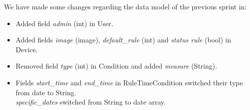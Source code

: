 \documentclass[11pt,a4paper]{article}
\begin{document}
We have made some changes regarding the data model of the previous sprint in:
\begin{itemize}
    \item Added field \textit{admin} (int) in User.
    \item Added fields \textit{image} (image), \textit{default\_rule} (int) and \textit{status rule} (bool) in Device.
    \item Removed field \textit{type} (int) in Condition and added \textit{measure} (String).
    \item Fields \textit{start\_time} and \textit{end\_time} in RuleTimeCondition switched their type from date to String.\\ \textit{specific\_dates} switched from String to date array.
\end{itemize}
\newpage
\end{document}
